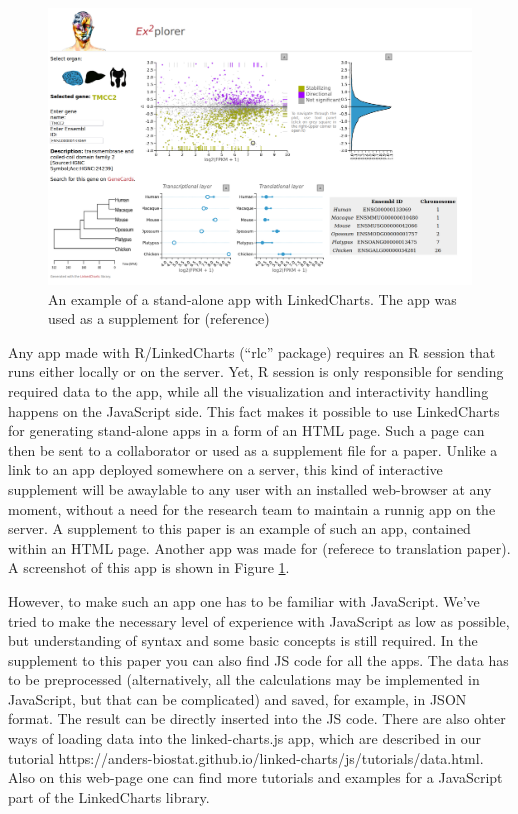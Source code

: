 \documentclass[twocolumn,10pt]{article}
\begin{document}
\begin{figure}[h]
  \includegraphics[width=\textwidth]{FigF/figF.png}
  \caption{An example of a stand-alone app with LinkedCharts. The app was used as a supplement for (reference)}
  \label{FigF}
\end{figure}

Any app made with R/LinkedCharts (``rlc'' package) requires an R session that runs either locally or on the server. Yet, R session is only responsible for sending required data to the app, while all the visualization and interactivity handling happens on the JavaScript side. This fact makes it possible to use LinkedCharts for generating stand-alone apps in a form of an HTML page. Such a page can then be sent to a collaborator or used as a supplement file for a paper. Unlike a link to an app deployed somewhere on a server, this kind of interactive supplement will be awaylable to any user with an installed web-browser at any moment, without a need for the research team to maintain a runnig app on the server. A supplement to this paper is an example of such an app, contained within an HTML page. Another app was made for (referece to translation paper). A screenshot of this app is shown in Figure \ref{FigF}.

However, to make such an app one has to be familiar with JavaScript. We've tried to make the necessary level of experience with JavaScript as low as possible, but understanding of syntax and some basic concepts is still required. In the supplement to this paper you can also find JS code for all the apps. The data has to be preprocessed (alternatively, all the calculations may be implemented in JavaScript, but that can be complicated) and saved, for example, in JSON format. The result can be directly inserted into the JS code. There are also ohter ways of loading data into the linked-charts.js app, which are described in our tutorial https://anders-biostat.github.io/linked-charts/js/tutorials/data.html. Also on this web-page one can find more tutorials and examples for a JavaScript part of the LinkedCharts library.
\end{document}
